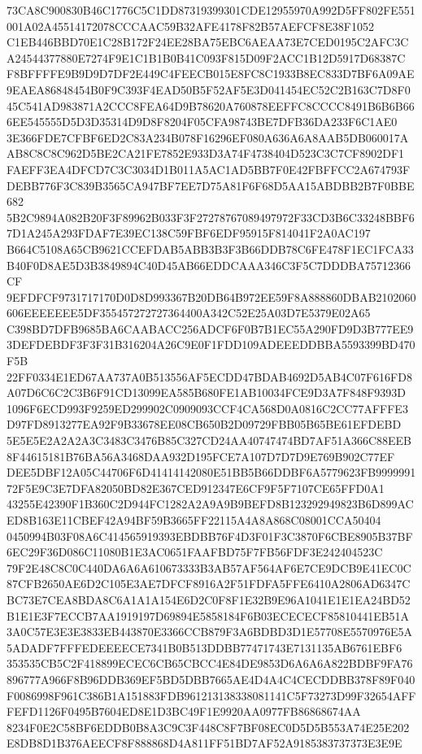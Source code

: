 \documentclass[UTF8,fontset=fandol,zihao=-4,a4paper]{ctexart}
\begin{document}
{{73CA8C900830B46C1776C5C1DD87319399301CDE12955970A992D5FF802FE551001A02A45514172078CCCAAC59B32AFE4178F82B57AEFCF8E38F1052
C1EB446BBD70E1C28B172F24EE28BA75EBC6AEAA73E7CED0195C2AFC3CA24544377880E7274F9E1C1B1B0B41C093F815D09F2ACC1B12D5917D68387C
F8BFFFFE9B9D9D7DF2E449C4FEECB015E8FC8C1933B8EC833D7BF6A09AE9EAEA86848454B0F9C393F4EAD50B5F52AF5E3D041454EC52C2B163C7D8F0
45C541AD983871A2CCC8FEA64D9B78620A760878EEFFC8CCCC8491B6B6B666EE545555D5D3D35314D9D8F8204F05CFA98743BE7DFB36DA233F6C1AE0
3E366FDE7CFBF6ED2C83A234B078F16296EF080A636A6A8AAB5DB060017AAB8C8C8C962D5BE2CA21FE7852E933D3A74F4738404D523C3C7CF8902DF1
FAEFF3EA4DFCD7C3C3034D1B011A5AC1AD5BB7F0E42FBFFCC2A674793FDEBB776F3C839B3565CA947BF7EE7D75A81F6F68D5AA15ABDBB2B7F0BBE682
5B2C9894A082B20F3F89962B033F3F27278767089497972F33CD3B6C33248BBF67D1A245A293FDAF7E39EC138C59FBF6EDF95915F814041F2A0AC197
B664C5108A65CB9621CCEFDAB5ABB3B3F3B66DDB78C6FE478F1EC1FCA33B40F0D8AE5D3B3849894C40D45AB66EDDCAAA346C3F5C7DDDBA75712366CF
9EFDFCF9731717170D0D8D993367B20DB64B972EE59F8A888860DBAB2102060606EEEEEEE5DF355457272727364400A342C52E25A03D7E5379E02A65
C398BD7DFB9685BA6CAABACC256ADCF6F0B7B1EC55A290FD9D3B777EE93DEFDEBDF3F3F31B316204A26C9E0F1FDD109ADEEEDDBBA5593399BD470F5B
22FF0334E1ED67AA737A0B513556AF5ECDD47BDAB4692D5AB4C07F616FD8A07D6C6C2C3B6F91CD13099EA585B680FE1AB10034FCE9D3A7F848F9393D
1096F6ECD993F9259ED299902C0909093CCF4CA568D0A0816C2CC77AFFFE3D97FD8913277EA92F9B33678EE08CB650B2D09729FBB05B65BE61EFDEBD
5E5E5E2A2A2A3C3483C3476B85C327CD24AA40747474BD7AF51A366C88EEB8F44615181B76BA56A3468DAA932D195FCE7A107D7D7D9E769B902C77EF
DEE5DBF12A05C44706F6D41414142080E51BB5B66DDBF6A5779623FB999999172F5E9C3E7DFA82050BD82E367CED912347E6CF9F5F7107CE65FFD0A1
43255E42390F1B360C2D944FC1282A2A9A9B9BEFD8B123292949823B6D899ACED8B163E11CBEF42A94BF59B3665FF22115A4A8A868C08001CCA50404
0450994B03F08A6C414565919393EBDBB76F4D3F01F3C3870F6CBE8905B37BF6EC29F36D086C11080B1E3AC0651FAAFBD75F7FB56FDF3E242404523C
79F2E48C8C0C440DA6A6A610673333B3AB57AF564AF6E7CE9DCB9E41EC0C87CFB2650AE6D2C105E3AE7DFCF8916A2F51FDFA5FFE6410A2806AD6347C
BC73E7CEA8BDA8C6A1A1A154E6D2C0F8F1E32B9E96A1041E1E1EA24BD52B1E1E3F7ECCB7AA1919197D69894E5858184F6B03ECECECF85810441EB51A
3A0C57E3E3E3833EB443870E3366CCB879F3A6BDBD3D1E57708E5570976E5A5ADADF7FFFEDEEEECE7341B0B513DDBB77471743E7131135AB6761EBF6
353535CB5C2F418899ECEC6CB65CBCC4E84DE9853D6A6A6A822BDBF9FA76896777A966F8B96DDB369EF5BD5DBB7665AE4D4A4C4CECDDBB378F89F040
F0086998F961C386B1A151883FDB961213138338081141C5F73273D99F32654AFFFEFD1126F0495B7604ED8E1D3BC49F1E9920AA0977FB86868674AA
8234F0E2C58BF6EDDB0B8A3C9C3F448C8F7BF08EC0D5D5B553A74E25E202E8DB8D1B376AEECF8F888868D4A811FF51BD7AF52A9185383737373E3E9E
}}
\end{document}
